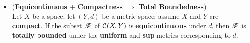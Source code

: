 \documentclass[11pt]{article}
\begin{document}
\begin{itemize}
\item \begin{lemma} (\textbf{Equicontinuous $+$ Compactness  $\Rightarrow$ Total Boundedness})  \citep{munkres2000topology}\\ 
Let $X$ be a space; let $(Y, d)$ be a metric space; assume $X$ and $Y$ are \textbf{compact}. If the subset ${\mathscr F}$ of ${\mathcal C}(X, Y)$ is \textbf{equicontinuous} under $d$, then ${\mathscr F}$ is \textbf{totally bounded} under the \textbf{uniform} and \textbf{sup} metrics corresponding to $d$.
\end{lemma}


%
%
%


\end{itemize}
\end{document}
